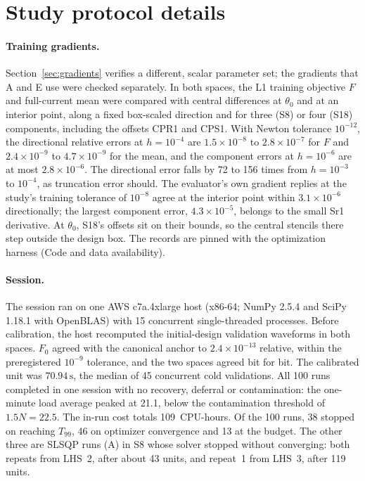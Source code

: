 \documentclass{anvil-paper}
\begin{document}
\section{Study protocol details}\label{sec:protocol-details}
\paragraph{Training gradients.}
Section~\ref{sec:gradients} verifies a different, scalar parameter set; the
gradients that A and E use were checked separately. In both spaces, the L1
training objective $F$ and full-current mean were compared with central
differences at $\theta_0$ and at an interior point, along a fixed
box-scaled direction and for three (S8) or four (S18) components,
including the offsets CPR1 and CPS1. With Newton tolerance $10^{-12}$, the
directional relative errors at $h=10^{-4}$ are $1.5\times10^{-8}$ to
$2.8\times10^{-7}$ for $F$ and $2.4\times10^{-9}$ to $4.7\times10^{-9}$ for
the mean, and the component errors at $h=10^{-6}$ are at most
$2.8\times10^{-6}$. The directional error falls by 72 to 156 times from
$h=10^{-3}$ to $10^{-4}$, as truncation error should. The evaluator's own
gradient replies at the study's training tolerance of $10^{-8}$ agree at
the interior point within $3.1\times10^{-6}$ directionally; the largest
component error, $4.3\times10^{-5}$, belongs to the small Sr1 derivative.
At $\theta_0$, S18's offsets sit on their bounds, so the central
stencils there step outside the design box. The records are pinned with the
optimization harness (Code and data availability).

\paragraph{Session.}
The session ran on one AWS c7a.4xlarge host (x86-64; NumPy 2.5.4 and
SciPy 1.18.1 with OpenBLAS) with 15 concurrent single-threaded processes.
Before calibration, the host recomputed the initial-design validation
waveforms in both spaces. $F_0$ agreed with the canonical anchor to
$2.4\times10^{-13}$ relative, within the preregistered $10^{-9}$ tolerance,
and the two spaces agreed bit for bit. The calibrated unit was
$70.94\,\mathrm{s}$, the median of 45 concurrent cold validations. All 100
runs completed in one session with no recovery, deferral or contamination:
the one-minute load average peaked at 21.1, below the contamination
threshold of $1.5N=22.5$. The in-run cost totals 109~CPU-hours. Of the
100 runs, 38 stopped on reaching $T_{99}$, 46 on optimizer convergence and
13 at the budget. The other three are SLSQP runs (A) in S8 whose
solver stopped without converging: both repeats from LHS~2, after about 43
units, and repeat~1 from LHS~3, after 119 units.
\end{document}

